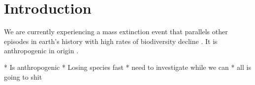 \chapter{Introduction}
\label{introduction}

We are currently experiencing a mass extinction event that parallels other episodes in earth's history with high rates of biodiversity decline \citep{Barnosky2011, Dirzo2014, Pimm1995}. It is anthropogenic in origin \citep{Morris2010}.

* Is anthropogenic
* Losing species fast
* need to investigate while we can
* all is going to shit
